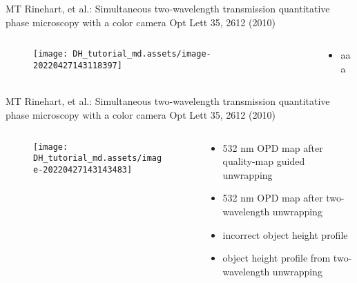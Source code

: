 \documentclass[t, aspectratio=169]{beamer}
\begin{document}
\begin{frame}{MT Rinehart, et al.: Simultaneous two-wavelength transmission quantitative phase microscopy with a color camera}
	\vspace{-3 mm}
	\small Opt Lett 35, 2612 (2010)
	\begin{columns}
		\begin{column}{.6\textwidth}
			\begin{figure}
				\texttt{[image: DH\_tutorial\_md.assets/image-20220427143118397]}
			\end{figure}
		\end{column}
		\begin{column}{.4\textwidth}
			\begin{itemize}
				\item aaa
			\end{itemize}
		\end{column}
	\end{columns}
\end{frame}


\begin{frame}{MT Rinehart, et al.: Simultaneous two-wavelength transmission quantitative phase microscopy with a color camera}
	\vspace{-3 mm}
	\small Opt Lett 35, 2612 (2010)
	\begin{columns}
		\begin{column}{.6\textwidth}
			\vspace{-5 mm}
			\begin{figure}
				\texttt{[image: DH\_tutorial\_md.assets/image-20220427143143483]}
			\end{figure}
		\end{column}
		\begin{column}{.4\textwidth}
			\begin{itemize}
				\item[a) ] 532 nm OPD map after quality-map guided unwrapping
				\item[b) ] 532 nm OPD map after two-wavelength unwrapping
				\item[c) ] incorrect object height profile
				\item[d) ] object height profile from two-wavelength unwrapping
			\end{itemize}
		\end{column}
	\end{columns}
\end{frame}
\end{document}
